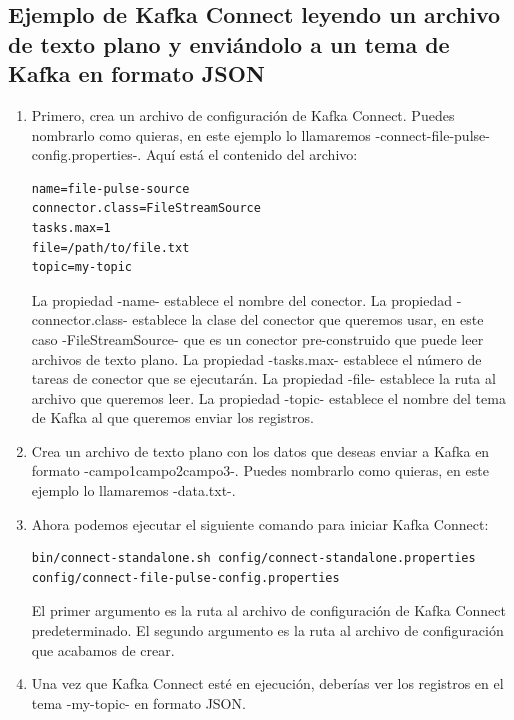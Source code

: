 \documentclass{article}
\begin{document}
\subsection{Ejemplo de Kafka Connect leyendo un archivo de texto plano y enviándolo a un tema de Kafka en formato JSON}

\begin{enumerate}
\item Primero, crea un archivo de configuración de Kafka Connect. Puedes nombrarlo como quieras, en este ejemplo lo llamaremos -connect-file-pulse-config.properties-. Aquí está el contenido del archivo:

\begin{lstlisting}[numbers=none]
name=file-pulse-source
connector.class=FileStreamSource
tasks.max=1
file=/path/to/file.txt
topic=my-topic
\end{lstlisting}

La propiedad -name- establece el nombre del conector. La propiedad -connector.class- establece la clase del conector que queremos usar, en este caso -FileStreamSource- que es un conector pre-construido que puede leer archivos de texto plano. La propiedad -tasks.max- establece el número de tareas de conector que se ejecutarán. La propiedad -file- establece la ruta al archivo que queremos leer. La propiedad -topic- establece el nombre del tema de Kafka al que queremos enviar los registros.

\item Crea un archivo de texto plano con los datos que deseas enviar a Kafka en formato -campo1campo2campo3-. Puedes nombrarlo como quieras, en este ejemplo lo llamaremos -data.txt-.

\item Ahora podemos ejecutar el siguiente comando para iniciar Kafka Connect:

\begin{lstlisting}[numbers=none]
bin/connect-standalone.sh config/connect-standalone.properties config/connect-file-pulse-config.properties
\end{lstlisting}

El primer argumento es la ruta al archivo de configuración de Kafka Connect predeterminado. El segundo argumento es la ruta al archivo de configuración que acabamos de crear.

\item Una vez que Kafka Connect esté en ejecución, deberías ver los registros en el tema -my-topic- en formato JSON.

\end{enumerate}
\end{document}
